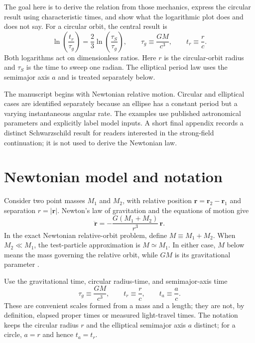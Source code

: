 \documentclass[12pt]{article}
\begin{document}
The goal here is to derive the relation from those mechanics, express the circular result using characteristic times, and show what the logarithmic plot does and does not say. For a circular orbit, the central result is
\begin{equation}
  \ln\!\left(\frac{t_r}{\tau_g}\right)
  =\frac{2}{3}\ln\!\left(\frac{\tau_S}{\tau_g}\right),
  \qquad
  \tau_g\equiv\frac{GM}{c^3},
  \qquad
  t_r\equiv\frac{r}{c}.
  \label{eq:central-result}
\end{equation}
Both logarithms act on dimensionless ratios. Here $r$ is the circular-orbit radius and $\tau_S$ is the time to sweep one radian. The elliptical period law uses the semimajor axis $a$ and is treated separately below.

The manuscript begins with Newtonian relative motion. Circular and elliptical cases are identified separately because an ellipse has a constant period but a varying instantaneous angular rate. The examples use published astronomical parameters and explicitly label model inputs. A short final appendix records a distinct Schwarzschild result for readers interested in the strong-field continuation; it is not used to derive the Newtonian law.

\section{Newtonian model and notation}
\label{sec:model}

Consider two point masses $M_1$ and $M_2$, with relative position $\boldsymbol r=\boldsymbol r_2-\boldsymbol r_1$ and separation $r=|\boldsymbol r|$. Newton's law of gravitation and the equations of motion give
\begin{equation}
  \ddot{\boldsymbol r}
  =-\frac{G(M_1+M_2)}{r^3}\,\boldsymbol r.
  \label{eq:relative-motion}
\end{equation}
In the exact Newtonian relative-orbit problem, define $M\equiv M_1+M_2$. When $M_2\ll M_1$, the test-particle approximation is $M\simeq M_1$. In either case, $M$ below means the mass governing the relative orbit, while $GM$ is its gravitational parameter \cite{OpenStaxKepler}.

Use the gravitational time, circular radius-time, and semimajor-axis time
\begin{equation}
  \tau_g\equiv\frac{GM}{c^3},
  \qquad
  t_r\equiv\frac{r}{c},
  \qquad
  t_a\equiv\frac{a}{c}.
  \label{eq:time-scales}
\end{equation}
These are convenient scales formed from a mass and a length; they are not, by definition, elapsed proper times or measured light-travel times. The notation keeps the circular radius $r$ and the elliptical semimajor axis $a$ distinct; for a circle, $a=r$ and hence $t_a=t_r$.
\end{document}

